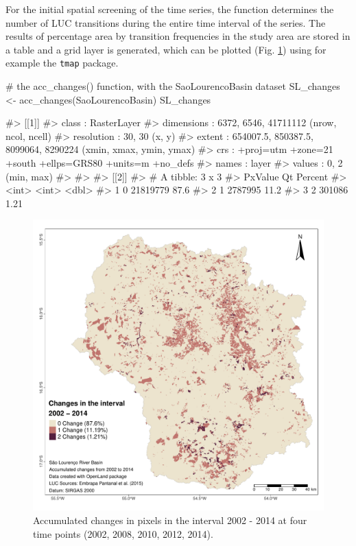 For the initial spatial screening of the time series, the 
function determines the number of LUC transitions during the entire time
interval of the series. The results of percentage area by transition
frequencies in the study area are stored in a table and a grid layer is
generated, which can be plotted (Fig. \ref{fig:acchange}) using for
example the \texttt{tmap} package.

\begin{Schunk}
\begin{Sinput}
# the acc_changes() function, with the SaoLourencoBasin dataset
SL_changes <- acc_changes(SaoLourencoBasin)
SL_changes
\end{Sinput}
\begin{Soutput}
#> [[1]]
#> class      : RasterLayer 
#> dimensions : 6372, 6546, 41711112  (nrow, ncol, ncell)
#> resolution : 30, 30  (x, y)
#> extent     : 654007.5, 850387.5, 8099064, 8290224  (xmin, xmax, ymin, ymax)
#> crs        : +proj=utm +zone=21 +south +ellps=GRS80 +units=m +no_defs 
#> names      : layer 
#> values     : 0, 2  (min, max)
#> 
#> 
#> [[2]]
#> # A tibble: 3 x 3
#>   PxValue       Qt Percent
#>     <int>    <int>   <dbl>
#> 1       0 21819779   87.6 
#> 2       1  2787995   11.2 
#> 3       2   301086    1.21
\end{Soutput}
\end{Schunk}

\begin{Schunk}
\begin{figure}[h]

{\centering \includegraphics[width=0.9\linewidth,trim={0 0.5cm 0 0.5cm},clip]{figures/acc_mymap.pdf} 

}

\caption[Accumulated changes in pixels in the interval 2002 - 2014 at four time points (2002, 2008, 2010, 2012, 2014)]{Accumulated changes in pixels in the interval 2002 - 2014 at four time points (2002, 2008, 2010, 2012, 2014).}\label{fig:acchange}
\end{figure}
\end{Schunk}

